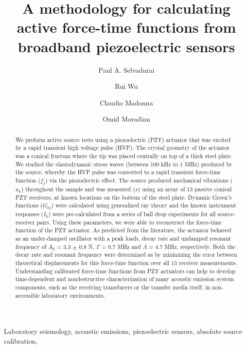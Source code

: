 \documentclass[preprint,3p, 11pt,authoryear]{elsarticle}
\begin{document}
\begin{frontmatter}



\title{A methodology for calculating active force-time functions from broadband piezoelectric sensors}

 \author[1]{Paul A. Selvadurai }
\author[2]{Rui Wu}
\author[3]{Claudio Madonna}
\author[2]{Omid Moradian}




\address[1]{Swiss Seismological Service, ETH Zurich, Zurich, Switzerland}
\address[2]{Engineering Geology Group, ETH Zurich, Zurich, Switzerland}
\address[3]{Department of Earth Sciences, ETH Zurich, Zurich, Switzerland}


\begin{abstract}
We preform active source tests using a piezoelectric (PZT) actuator that was excited by a rapid transient high voltage pulse (HVP). The crystal geometry of the actuator was a conical frustum where the tip was placed centrally on top of a thick steel plate. We studied the elastodynamic stress waves  (between 100 kHz to 1 MHz) produced by the source, whereby the HVP pulse was converted to a rapid transient force-time function ($f_{j}$) via the piezoelectric effect.  The source produced mechanical vibrations ($u_{k}$) throughout the sample and was measured ($s$) using an array of 13 passive conical PZT receivers, at known locations on the bottom of the steel plate. Dynamic Green's functions ($G_{kj}$) were calculated using generalized ray theory and the known instrument responses ($I_{k}$) were pre-calculated from a series of ball drop experiments for all source-receiver pairs. Using these parameters, we were able to reconstruct the force-time function of the PZT actuator. As predicted from the literature, the actuator behaved as an under-damped oscillator with a peak loads, decay rate and undamped resonant frequency of $A_{0}$ = 3.3 $\pm$ 0.8 N, $\Gamma$ = 0.7 MHz and $\Lambda$ = 4.7 MHz, respectively.  Both the decay rate and resonant frequency were determined as by minimizing the error between theoretical displacements for this force-time function over all 13 receiver measurements. Understanding calibrated force-time functions from PZT actuators can help to develop time-dependent and nondestructive characterization of many acoustic emission system components, such as the receiving transducers or the transfer media itself, in non-accessible laboratory environments. 
\end{abstract}

\begin{keyword}
Laboratory seismology, acoustic emissions,  piezoelectric sensors, absolute source calibration, 
\end{keyword}
\end{frontmatter}
\end{document}
